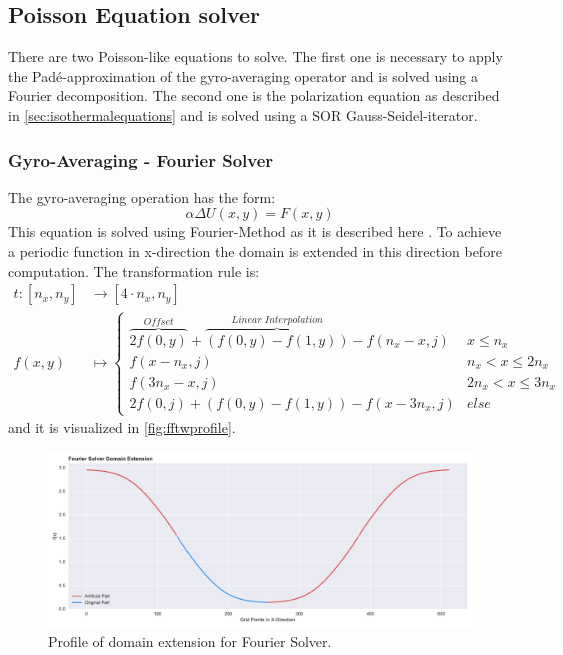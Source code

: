 \documentclass[master.tex]{subfiles}
\begin{document}
\subsection{Poisson Equation solver}
There are two Poisson-like equations to solve. The first one is necessary to apply the Padé-approximation of the gyro-averaging operator and is solved using a Fourier decomposition. The second one is the polarization equation as described in \autoref{sec:isothermalequations} and is solved using a \ac{SOR} Gauss-Seidel-iterator.

\subsubsection{Gyro-Averaging - Fourier Solver}
The gyro-averaging operation has the form:
\begin{equation}
    \alpha \Delta U(x, y) = F(x, y)
\end{equation}
This equation is solved using Fourier-Method as it is described here \cite{fft-poisson}. To achieve a periodic function in x-direction the domain is extended in this direction before computation. The transformation rule is:
\begin{equation}
\label{eq:gyro-transformation}
\begin{split}
    t\colon [n_x, n_y] & \to [4 \cdot n_x, n_y]\\
    f(x, y) &\mapsto \begin{cases}
    \overbrace{2 f(0, y)}^{Offset} + \overbrace{(f(0, y) - f(1, y))}^{Linear \,\, Interpolation} - f(n_x - x, j) & x \leq n_x\\
    f(x - n_x, j) & n_x < x \leq 2n_x\\
    f(3n_x-x,j) & 2n_x < x \leq 3n_x \\
    2 f(0, j) + (f(0, y) - f(1, y))  - f(x - 3n_x, j) & else
    \end{cases}
\end{split}
\end{equation}
and it is visualized in \autoref{fig:fftwprofile}.
\begin{figure}[!hbtp]
    \includegraphics[width=\linewidth]{pdfs/fftwextension.pdf}
    \caption{Profile of domain extension for Fourier Solver.}
    \label{fig:fftwprofile}
\end{figure}
\end{document}

